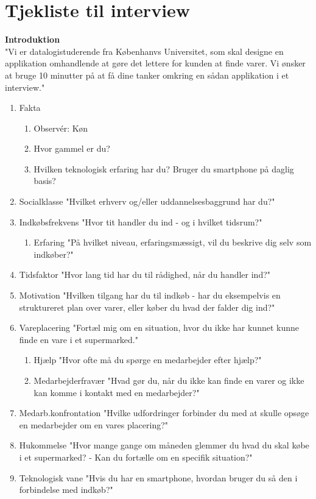 \documentclass[12pt]{article}
\begin{document}
\section{Tjekliste til interview}
\textbf{Introduktion}\\
"Vi er datalogistuderende fra Københanvs Universitet, som skal designe en applikation omhandlende at gøre det lettere for kunden at finde varer. Vi ønsker at bruge 10 minutter på at få dine tanker omkring en sådan applikation  i et interview."
 
\begin{enumerate}
\item Fakta
\begin{enumerate}
\item Observér: Køn
\item Hvor gammel er du?
\item Hvilken teknologisk erfaring har du? Bruger du smartphone på daglig basis?
\end{enumerate}

\item Socialklasse "Hvilket erhverv og/eller uddannelsesbaggrund har du?"

\item Indkøbsfrekvens "Hvor tit handler du ind - og i hvilket tidsrum?"

\begin{enumerate}
\item Erfaring	"På hvilket niveau, erfaringsmæssigt, vil du beskrive dig selv som indkøber?"
\end{enumerate}

\item Tidsfaktor "Hvor lang tid har du til rådighed, når du handler ind?"
\item Motivation "Hvilken tilgang har du til indkøb - har du eksempelvis en struktureret plan over varer, eller køber du hvad der falder dig ind?"
\item Vareplacering "Fortæl mig om en situation, hvor du ikke har kunnet kunne finde en vare i et supermarked."

\begin{enumerate}
\item Hjælp "Hvor ofte må du spørge en medarbejder efter hjælp?"
\item Medarbejderfravær "Hvad gør du, når du ikke kan finde en varer og ikke kan komme i kontakt med en medarbejder?"
\end{enumerate}

\item Medarb.konfrontation "Hvilke udfordringer forbinder du med at skulle opsøge en medarbejder om en vares placering?"
\item Hukommelse "Hvor mange gange om måneden glemmer du hvad du skal købe i et supermarked? - Kan du fortælle om en specifik situation?"
\item Teknologisk vane "Hvis du har en smartphone, hvordan bruger du så den i forbindelse med indkøb?"


\end{enumerate}
\end{document}
